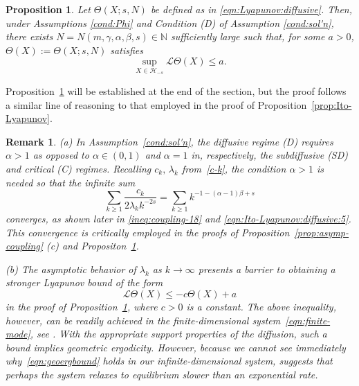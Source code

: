 \documentclass[11pt]{amsart}
\theoremstyle{definition}
\newcommand{\nbb}{\mathbb{N}}
\renewcommand{\L}{\mathcal{L}}
\renewcommand{\H}{\mathcal{H}}
\theoremstyle{definition}
\theoremstyle{plain}
\newtheorem{proposition}[theorem]{Proposition}
\newtheorem{remark}[theorem]{Remark}
\numberwithin{equation}{section}
\begin{document}
\begin{proposition}\label{prop:Ito-Lyapunov:diffusive}
Let $\Theta(X;s,N)$ be defined as in \eqref{eqn:Lyapunov:diffusive}.  Then, under Assumptions \ref{cond:Phi} and Condition \emph{(D)} of Assumption \ref{cond:sol'n}, there exists $N=N(m,\gamma,\alpha,\beta,s) \in \nbb$ sufficiently large such that, for some $ a > 0$, $\Theta(X):=\Theta(X;s,N)$ satisfies
\begin{displaymath}
\sup_{X\in\H_{-s}}\L \Theta(X ) \leq a.
\end{displaymath}
\end{proposition}
\noindent Proposition~\ref{prop:Ito-Lyapunov:diffusive} will be established at the end of the section, but the proof follows a similar line of reasoning to that employed in the proof of Proposition~\ref{prop:Ito-Lyapunov}.  

\begin{remark} (a) In Assumption~\ref{cond:sol'n}, the diffusive regime (D) requires $\alpha >1$ as opposed to $\alpha \in (0,1)$ and $\alpha =1$ in, respectively, the subdiffusive (SD) and critical (C) regimes.  Recalling $c_k,\,\lambda_k$ from~\eqref{c-k}, the condition $\alpha>1$ is needed so that the infinite sum 
\begin{displaymath}
\sum_{k\geq 1}\frac{c_k}{2\lambda_k k^{-2s}}=\sum_{k\geq 1}k^{-1-(\alpha-1)\beta+s}
\end{displaymath} 
converges, as shown later in \eqref{ineq:coupling-18} and \eqref{eqn:Ito-Lyapunov:diffusive:5}.  This convergence is critically employed in the proofs of Proposition~\ref{prop:asymp-coupling} (c) and Propositon~\ref{prop:Ito-Lyapunov:diffusive}. 

(b) The asymptotic behavior of $\lambda_k$ as $k\to\infty$ presents a barrier to obtaining a stronger Lyapunov bound of the form
\begin{displaymath}
\label{eqn:geoergbound}
\L \Theta(X ) \leq -c\Theta(X) + a
\end{displaymath}
in the proof of Proposition~\ref{prop:Ito-Lyapunov:diffusive}, where $c>0$ is a constant.  The above inequality, however, can be readily achieved in the finite-dimensional system~\eqref{eqn:finite-mode}, see \cite{ottobre2011asymptotic}.  With the appropriate support properties of the diffusion, such a bound implies geometric ergodicity.  However, because we cannot see immediately why~\eqref{eqn:geoergbound} holds in our infinite-dimensional system, suggests that perhaps the system relaxes to equilibrium slower than an exponential rate.          
\end{remark}
\end{document}
